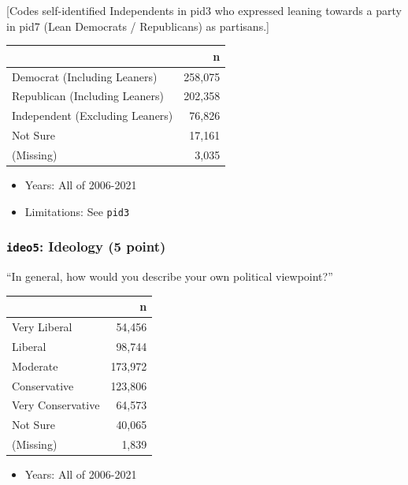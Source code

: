 \documentclass[10pt,article,oneside]{memoir}
\theoremstyle{definition}
\begin{document}
{[}Codes self-identified Independents in pid3 who expressed leaning
towards a party in pid7 (Lean Democrats / Republicans) as partisans.{]}

\begin{table}[H]
\centering
\begin{tabular}[t]{lr}
\toprule
 & n\\
\midrule
Democrat (Including Leaners) & 258,075\\
Republican (Including Leaners) & 202,358\\
Independent (Excluding Leaners) & 76,826\\
Not Sure & 17,161\\
(Missing) & 3,035\\
\bottomrule
\end{tabular}
\end{table}

\begin{itemize}
\tightlist
\item
  Years: All of 2006-2021
\item
  Limitations: See \texttt{pid3}
\end{itemize}

\hypertarget{ideo5-ideology-5-point}{%
\subsubsection{\texorpdfstring{\texttt{ideo5}: Ideology (5
point)}{ideo5: Ideology (5 point)}}\label{ideo5-ideology-5-point}}

``In general, how would you describe your own political viewpoint?''

\begin{table}[H]
\centering
\begin{tabular}[t]{lr}
\toprule
 & n\\
\midrule
Very Liberal & 54,456\\
Liberal & 98,744\\
Moderate & 173,972\\
Conservative & 123,806\\
Very Conservative & 64,573\\
Not Sure & 40,065\\
(Missing) & 1,839\\
\bottomrule
\end{tabular}
\end{table}

\begin{itemize}
\tightlist
\item
  Years: All of 2006-2021
\end{itemize}
\end{document}
